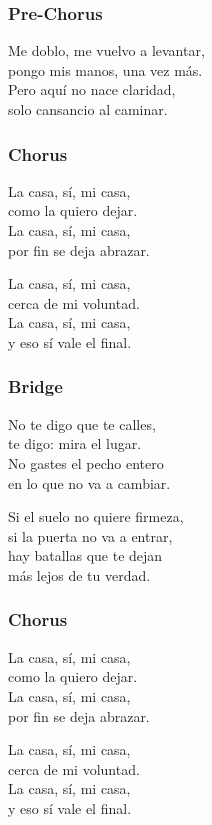 \subsubsection{Pre-Chorus}\label{pre-chorus-36}

Me doblo, me vuelvo a levantar,\\
pongo mis manos, una vez más.\\
Pero aquí no nace claridad,\\
solo cansancio al caminar.

\subsubsection{Chorus}\label{chorus-56}

La casa, sí, mi casa,\\
como la quiero dejar.\\
La casa, sí, mi casa,\\
por fin se deja abrazar.

La casa, sí, mi casa,\\
cerca de mi voluntad.\\
La casa, sí, mi casa,\\
y eso sí vale el final.

\subsubsection{Bridge}\label{bridge-21}

No te digo que te calles,\\
te digo: mira el lugar.\\
No gastes el pecho entero\\
en lo que no va a cambiar.

Si el suelo no quiere firmeza,\\
si la puerta no va a entrar,\\
hay batallas que te dejan\\
más lejos de tu verdad.

\subsubsection{Chorus}\label{chorus-57}

La casa, sí, mi casa,\\
como la quiero dejar.\\
La casa, sí, mi casa,\\
por fin se deja abrazar.

La casa, sí, mi casa,\\
cerca de mi voluntad.\\
La casa, sí, mi casa,\\
y eso sí vale el final.

